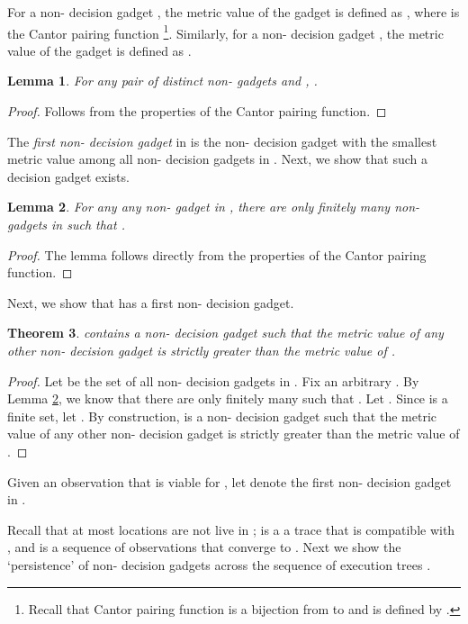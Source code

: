\documentclass[11pt]{article}
\newtheorem{theorem}{Theorem}
\numberwithin{theorem}{section}
\newtheorem{lemma}[theorem]{Lemma}
\begin{document}
For a non- decision gadget , the metric value of the gadget is defined as , where  is the Cantor pairing function \cite{cantor:ueed}\footnote{Recall that Cantor pairing function  is a bijection from  to  and is defined by .}.
Similarly, for a non- decision gadget , the metric value of the gadget is defined as .



\begin{lemma}\label{lem:distinctGadgetsDistinctMetricValue}
For any pair of distinct non- gadgets  and , .
\end{lemma}
\begin{proof}
Follows from the properties of the Cantor pairing function.
\end{proof}

The \emph{first non- decision gadget} in  is the non- decision gadget with the smallest metric value among all non- decision gadgets in . Next, we show that such a decision gadget exists.

\begin{lemma}\label{lem:finitelyManySmallerGadgets}
For any any non- gadget  in , there are only finitely many non- gadgets  in  such that .
\end{lemma}
\begin{proof}
The lemma follows directly from the properties of the Cantor pairing function.
\end{proof}

Next, we show that  has a first non- decision gadget.
\begin{theorem}\label{thm:smallestGadget}
 contains a non- decision gadget  such that the metric
value of any other non- decision gadget  is strictly greater than the
metric value of .
\end{theorem}
\begin{proof}
Let  be the set of all non- decision gadgets in .
Fix an arbitrary . By Lemma \ref{lem:finitelyManySmallerGadgets}, we know that there are only finitely many  such that . Let . Since  is a finite set, let . By construction,  is a non- decision gadget such that the metric
value of any other non- decision gadget  is strictly greater than the
metric value of .
\end{proof}



Given an observation  that is viable for , let
 denote the first non- decision gadget in .

Recall that at most  locations are not
live in ;  is a a trace that is compatible with , and  is a sequence of observations that converge to . Next we show the `persistence' of non- decision gadgets across the sequence of execution trees .
\end{document}

